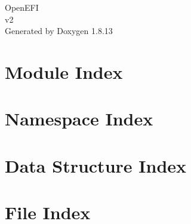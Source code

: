 \documentclass[twoside]{book}
\newcommand{\+}{\discretionary{\mbox{\scriptsize$\hookleftarrow$}}{}{}}
\newcommand{\clearemptydoublepage}{%
  \newpage{\pagestyle{empty}\cleardoublepage}%
}
\begin{document}
\hypersetup{pageanchor=false,
             bookmarksnumbered=true,
             pdfencoding=unicode
            }
\begin{titlepage}
\vspace*{7cm}
\begin{center}%
{\Large Open\+E\+FI \\[1ex]\large v2 }\\
\vspace*{1cm}
{\large Generated by Doxygen 1.8.13}\\
\end{center}
\end{titlepage}
\clearemptydoublepage
{}
\tableofcontents
\clearemptydoublepage
{}
\hypersetup{pageanchor=true}

\chapter{Module Index}

\chapter{Namespace Index}

\chapter{Data Structure Index}

\chapter{File Index}

\end{document}
